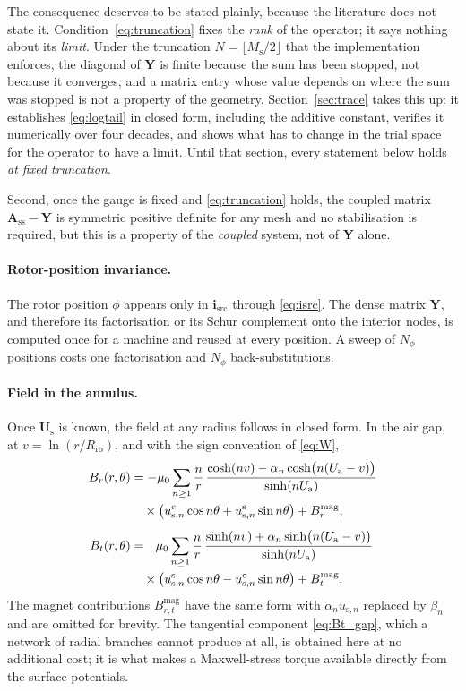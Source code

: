 \documentclass[10pt,a4paper,twocolumn]{article}
\newcommand{\Rro}{R_{\mathrm{ro}}}
\newcommand{\Ua}{U_{\mathrm{a}}}
\theoremstyle{plain}
\theoremstyle{remark}
\begin{document}
The consequence deserves to be stated plainly, because the literature
does not state it. Condition~\eqref{eq:truncation} fixes the \emph{rank}
of the operator; it says nothing about its \emph{limit}. Under the
truncation $N=\lfloor M_{\mathrm{s}}/2\rfloor$ that the implementation
enforces, the diagonal of $\bm{Y}$ is finite because the sum has been
stopped, not because it converges, and a matrix entry whose value
depends on where the sum was stopped is not a property of the geometry.
Section~\ref{sec:trace} takes this up: it establishes
\eqref{eq:logtail} in closed form, including the additive constant,
verifies it numerically over four decades, and shows what has to change
in the trial space for the operator to have a limit. Until that section,
every statement below holds \emph{at fixed truncation}.

Second, once the gauge is fixed and \eqref{eq:truncation} holds, the
coupled matrix $\bm{A}_{\mathrm{ss}}-\bm{Y}$ is symmetric positive
definite for any mesh and no stabilisation is required, but this is a
property of the \emph{coupled} system, not of $\bm{Y}$ alone.


\paragraph{Rotor-position invariance.}
The rotor position $\phi$ appears only in $\bm{i}_{\mathrm{src}}$
through \eqref{eq:isrc}. The dense matrix $\bm{Y}$, and therefore its
factorisation or its Schur complement onto the interior nodes, is
computed once for a machine and reused at every position. A sweep of
$N_\phi$ positions costs one factorisation and $N_\phi$
back-substitutions.

\paragraph{Field in the annulus.}
Once $\bm{U}_{\mathrm{s}}$ is known, the field at any radius follows in
closed form. In the air gap, at $v=\ln(r/\Rro)$, and with the sign
convention of \eqref{eq:W},
\begin{align}
B_r(r,\theta) &= -\mu_0\sum_{n\ge1}\frac{n}{r}\,
\frac{\cosh(nv)-\alpha_n\cosh\!\big(n(\Ua-v)\big)}{\sinh(n\Ua)}\notag\\
&\quad\times\big(u^{\mathrm{c}}_{\mathrm{s},n}\cos n\theta
    + u^{\mathrm{s}}_{\mathrm{s},n}\sin n\theta\big)
+ B_r^{\mathrm{mag}},
\label{eq:Br_gap}\\[1ex]
B_t(r,\theta) &= \ \ \mu_0\sum_{n\ge1}\frac{n}{r}\,
\frac{\sinh(nv)+\alpha_n\sinh\!\big(n(\Ua-v)\big)}{\sinh(n\Ua)}\notag\\
&\quad\times\big(u^{\mathrm{s}}_{\mathrm{s},n}\cos n\theta
     - u^{\mathrm{c}}_{\mathrm{s},n}\sin n\theta\big)
+ B_t^{\mathrm{mag}}.
\label{eq:Bt_gap}
\end{align}
The magnet contributions $B^{\mathrm{mag}}_{r,t}$ have the same form
with $\alpha_n u_{\mathrm{s},n}$ replaced by $\beta_n$ and are omitted
for brevity. The tangential component \eqref{eq:Bt_gap}, which a network
of radial branches cannot produce at all, is obtained here at no
additional cost; it is what makes a Maxwell-stress torque available
directly from the surface potentials.
\end{document}

